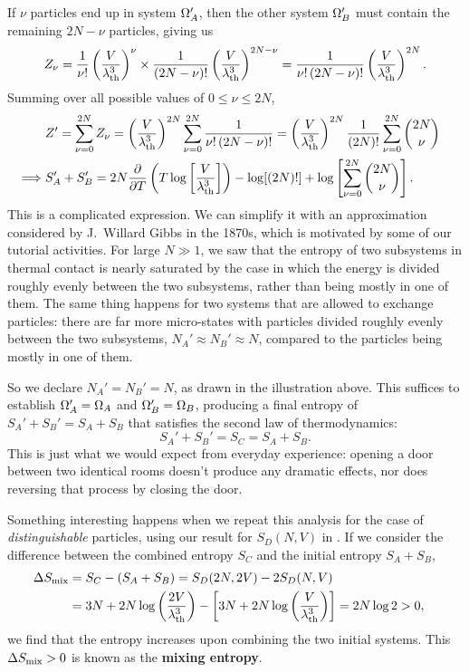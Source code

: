 If $\nu$ particles end up in system $\Omega_A'$, then the other system $\Omega_B'$ must contain the remaining $2N - \nu$ particles, giving us
\begin{equation*}
  Z_{\nu} = \frac{1}{\nu!} \left(\frac{V}{\lambda_{\mathrm{th}}^3}\right)^{\nu} \times \frac{1}{(2N - \nu)!} \left(\frac{V}{\lambda_{\mathrm{th}}^3}\right)^{2N - \nu} = \frac{1}{\nu! \, (2N - \nu)!} \left(\frac{V}{\lambda_{\mathrm{th}}^3}\right)^{2N}.
\end{equation*}
Summing over all possible values of $0 \leq \nu \leq 2N$,
\begin{align*}
  & Z' = \sum_{\nu = 0}^{2N} Z_{\nu} = \left(\frac{V}{\lambda_{\mathrm{th}}^3}\right)^{2N} \sum_{\nu = 0}^{2N} \frac{1}{\nu! \, (2N - \nu)!} = \left(\frac{V}{\lambda_{\mathrm{th}}^3}\right)^{2N} \frac{1}{(2N)!} \sum_{\nu = 0}^{2N} \binom{2N}{\nu} \cr
  \implies & S_A' + S_B' = 2N \frac{\partial }{\partial T}\left(T\log \left[\frac{V}{\lambda_{\mathrm{th}}^3}\right]\right) - \log[(2N)!] + \log\left[\sum_{\nu = 0}^{2N} \binom{2N}{\nu}\right].
\end{align*}
This is a complicated expression.
We can simplify it with an approximation considered by J.\ Willard Gibbs in the 1870s, which is motivated by some of our tutorial activities.
For large $N \gg 1$, we saw that the entropy of two subsystems in thermal contact is nearly saturated by the case in which the energy is divided roughly evenly between the two subsystems, rather than being mostly in one of them.
The same thing happens for two systems that are allowed to exchange particles: there are far more micro-states with particles divided roughly evenly between the two subsystems, $N_A' \approx N_B' \approx N$, compared to the particles being mostly in one of them.

So we declare $N_A' = N_B' = N$, as drawn in the illustration above.
This suffices to establish $\Omega_A' = \Omega_A$ and $\Omega_B' = \Omega_B$, producing a final entropy of $S_A' + S_B' = S_A + S_B$ that satisfies the second law of thermodynamics:
\begin{equation*}
  S_A' + S_B' = S_C = S_A + S_B.
\end{equation*}
This is just what we would expect from everyday experience: opening a door between two identical rooms doesn't produce any dramatic effects, nor does reversing that process by closing the door.

Something interesting happens when we repeat this analysis for the case of \textit{distinguishable} particles, using our result for $S_D(N, V)$ in .
If we consider the difference between the combined entropy $S_C$ and the initial entropy $S_A + S_B$,
\begin{align}
  \Delta S_{\mathrm{mix}} & = S_C - (S_A + S_B) = S_D(2N, 2V) - 2S_D(N, V) \cr
                       & = 3N + 2N \log\left(\frac{2V}{\lambda_{\mathrm{th}}^3}\right) - \left[3N + 2N \log\left(\frac{V}{\lambda_{\mathrm{th}}^3}\right)\right] = 2N\log 2 > 0, \label{eq:mixing_entropy}
\end{align}
we find that the entropy increases upon combining the two initial systems.
This $\Delta S_{\mathrm{mix}} > 0$ is known as the \textbf{mixing entropy}.

